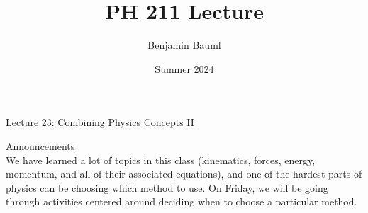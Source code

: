 \documentclass[]{article}
\title{PH 211 Lecture \Week}
\author{Benjamin Bauml}
\date{Summer 2024}
\newcommand{\Week}{23}
\begin{document}
\begin{TeacherMargin}

\end{TeacherMargin}
\begin{PresentSpace}
\begin{center}
	\huge Lecture \Week: Combining Physics Concepts II
\end{center}
\vspace{0.5cm}
\underline{Announcements} \\
We have learned a lot of topics in this class (kinematics, forces, energy, momentum, and all of their associated equations), and one of the hardest parts of physics can be choosing which method to use. On Friday, we will be going through activities centered around deciding when to choose a particular method.
\end{PresentSpace}
\newpage
\end{document}
